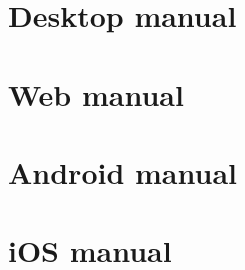 

\section{Desktop manual}


\section{Web manual}


\section{Android manual}


\section{iOS manual}

